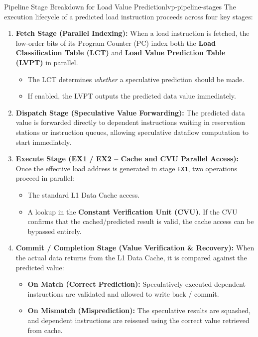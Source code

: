 \begin{definition}{Pipeline Stage Breakdown for Load Value Prediction}{lvp-pipeline-stages}
The execution lifecycle of a predicted load instruction proceeds across four key stages:
\begin{enumerate}
    \item \textbf{Fetch Stage (Parallel Indexing):} 
    When a load instruction is fetched, the low-order bits of its Program Counter (PC) index both the \textbf{Load Classification Table (LCT)} and \textbf{Load Value Prediction Table (LVPT)} in parallel.
    \begin{itemize}
        \item The LCT determines \textit{whether} a speculative prediction should be made.
        \item If enabled, the LVPT outputs the predicted data value immediately.
    \end{itemize}
    \item \textbf{Dispatch Stage (Speculative Value Forwarding):} 
    The predicted data value is forwarded directly to dependent instructions waiting in reservation stations or instruction queues, allowing speculative dataflow computation to start immediately.
    \item \textbf{Execute Stage (EX1 / EX2 -- Cache and CVU Parallel Access):}
    Once the effective load address is generated in stage \texttt{EX1}, two operations proceed in parallel:
    \begin{itemize}
        \item The standard L1 Data Cache access.
        \item A lookup in the \textbf{Constant Verification Unit (CVU)}. If the CVU confirms that the cached/predicted result is valid, the cache access can be bypassed entirely.
    \end{itemize}
    \item \textbf{Commit / Completion Stage (Value Verification \& Recovery):}
    When the actual data returns from the L1 Data Cache, it is compared against the predicted value:
    \begin{itemize}
        \item \textbf{On Match (Correct Prediction):} Speculatively executed dependent instructions are validated and allowed to write back / commit.
        \item \textbf{On Mismatch (Misprediction):} The speculative results are squashed, and dependent instructions are reissued using the correct value retrieved from cache.
    \end{itemize}
\end{enumerate}
\end{definition}

